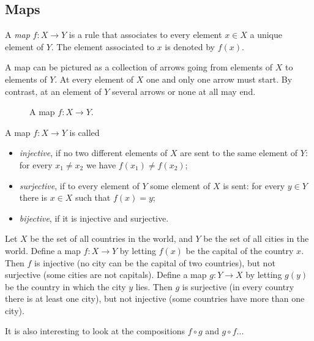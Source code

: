 \begin{page}
\setcounter{section}{2}
\setcounter{subsection}{1}
\setcounter{dfn}{0}
\label{portion:20}

\subsection{Maps}
A \emph{map} $f \colon X \to Y$ is a rule that associates to every element $x \in X$ a unique element of $Y$.
The element associated to $x$ is denoted by $f(x)$.

A map can be pictured as a collection of arrows going from elements of $X$ to elements of $Y$.
At every element of $X$ one and only one arrow must start.
By contrast, at an element of $Y$ several arrows or none at all may end.

\begin{figure}[ht]
\begin{center}

\end{center}
\caption{A map $f \colon X \to Y$.}
\label{fig:Map}
\end{figure}

A map $f \colon X \to Y$ is called
\begin{itemize}
\item
\emph{injective}, if no two different elements of $X$ are sent to the same element of $Y$: for every $x_1 \ne x_2$ we have $f(x_1) \ne f(x_2)$;
\item
\emph{surjective}, if to every element of $Y$ some element of $X$ is sent: for every $y \in Y$ there is $x \in X$ such that $f(x) = y$;
\item
\emph{bijective}, if it is injective and surjective.
\end{itemize}


\end{page}

\begin{page}
\setcounter{section}{2}
\setcounter{subsection}{1}
\setcounter{dfn}{1}
\label{portion:22}

\begin{exl}
Let $X$ be the set of all countries in the world, and $Y$ be the set of all cities in the world.
Define a map $f \colon X \to Y$ by letting $f(x)$ be the capital of the country $x$.
Then $f$ is injective (no city can be the capital of two countries), but not surjective (some cities are not capitals).
Define a map $g \colon Y \to X$ by letting $g(y)$ be the country in which the city $y$ lies.
Then $g$ is surjective (in every country there is at least one city), but not injective (some countries have more than one city).

It is also interesting to look at the compositions $f \circ g$ and $g \circ f$...
\end{exl}

\end{page}

